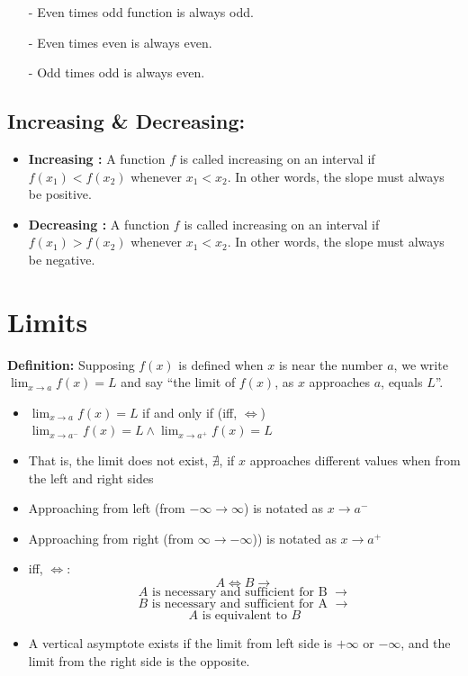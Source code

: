 \documentclass[12pt]{article}
\begin{document}
\noindent\hrulefill

\begin{itemize}
    \item[-] Even times odd function is always odd.
    \item[-] Even times even is always even.
    \item[-] Odd times odd is always even.
\end{itemize}

\subsection{Increasing \& Decreasing:}
\begin{itemize}
\item \textbf{Increasing :} A  function $f$ is called increasing on an interval if $f(x_1) < f(x_2)$ whenever $x_1 < x_2$. In other words, the slope must always be positive.
\item \textbf{Decreasing :} A  function $f$ is called increasing on an interval if $f(x_1) > f(x_2)$ whenever $x_1 < x_2$. In other words, the slope must always be negative.
\end{itemize}


\section{Limits}

\textbf{Definition: } Supposing $f(x)$ is defined when $x$ is near the number $a$, we write $\lim_{x\to a} f(x) = L$ and say ``the limit of $f(x)$, as $x$ approaches $a$, equals $L$''.


\begin{itemize}
    \item $\lim_{x\to a} f(x) = L$ if and only if (iff, $\iff$) $\lim_{x\to a^-} f(x) = L \wedge \lim_{x\to a^+} f(x) = L$
    \item That is, the limit does not exist, $\nexists$, if $x$ approaches different values when from the left and right sides 
    \item Approaching from left (from $-\infty \to \infty$) is notated as $x \to a^-$
    \item Approaching from right (from $\infty \to -\infty$)) is notated as $x \to a^+$
    \item iff, $\iff$:
        $$A \iff B \rightarrow{}$$
        $$A \text{ is necessary and sufficient for B }\rightarrow{}$$
        $$B \text{ is necessary and sufficient for A } \rightarrow{}$$
        $$A \text{ is equivalent to } B$$
    \item A vertical asymptote exists if the limit from left side is $+\infty$ or $-\infty$, and the limit from the right side is the opposite.
\end{itemize}
\end{document}
